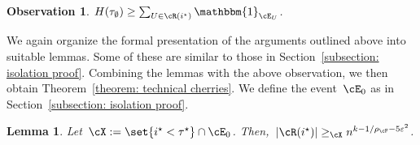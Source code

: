 \documentclass[11pt]{amsart}
\newcommand{\eps}{\varepsilon}
\DeclarePairedDelimiter{\abs}{\lvert}{\rvert}
\newcommand{\ind}{\mathbbm{1}}
\newcommand{\Xgeq}{\geq_{\cX}}
\newtheorem{lemma}[algocf]{Lemma}
\newtheorem{observation}[algocf]{Observation}
\theoremstyle{definition}
\numberwithin{equation}{section}
\begin{document}
	\begin{observation}\label{observation: remain configuration effect cherry}
		$H(\tau_\emptyset)\geq \sum_{U\in \cR(i^\star)}\ind_{\cE_U}$.
	\end{observation}
	
	We again organize the formal presentation of the arguments outlined above into suitable lemmas.
	Some of these are similar to those in Section~\ref{subsection: isolation proof}.
	Combining the lemmas with the above observation, we then obtain Theorem~\ref{theorem: technical cherries}.
	We define the event~$\cE_0$ as in Section~\ref{subsection: isolation proof}.
	
	\begin{lemma}\label{lemma: remain configuration bound cherry}
		Let~$\cX:=\set{i^\star <\tau^\star}\cap \cE_0$.
		Then,~$\abs{\cR(i^\star)}\Xgeq n^{k-1/\rho_\cF-5\eps^2}$.
	\end{lemma}
\end{document}

